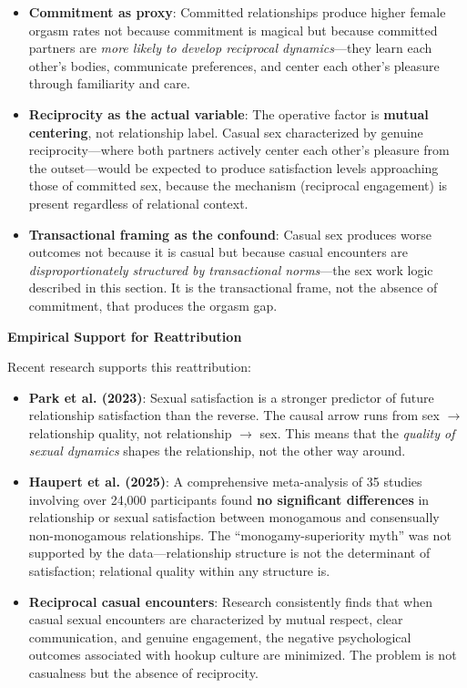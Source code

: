 \documentclass[12pt, letterpaper]{article}
\begin{document}
\begin{itemize}
    \item \textbf{Commitment as proxy}: Committed relationships produce higher female orgasm rates not because commitment is magical but because committed partners are \textit{more likely to develop reciprocal dynamics}---they learn each other's bodies, communicate preferences, and center each other's pleasure through familiarity and care.
    
    \item \textbf{Reciprocity as the actual variable}: The operative factor is \textbf{mutual centering}, not relationship label. Casual sex characterized by genuine reciprocity---where both partners actively center each other's pleasure from the outset---would be expected to produce satisfaction levels approaching those of committed sex, because the mechanism (reciprocal engagement) is present regardless of relational context.
    
    \item \textbf{Transactional framing as the confound}: Casual sex produces worse outcomes not because it is casual but because casual encounters are \textit{disproportionately structured by transactional norms}---the sex work logic described in this section. It is the transactional frame, not the absence of commitment, that produces the orgasm gap.
\end{itemize}

\textbf{Empirical Support for Reattribution}

Recent research supports this reattribution:

\begin{itemize}
    \item \textbf{Park et al. (2023)}: Sexual satisfaction is a stronger predictor of future relationship satisfaction than the reverse. The causal arrow runs from sex $\rightarrow$ relationship quality, not relationship $\rightarrow$ sex. This means that the \textit{quality of sexual dynamics} shapes the relationship, not the other way around.
    
    \item \textbf{Haupert et al. (2025)}: A comprehensive meta-analysis of 35 studies involving over 24,000 participants found \textbf{no significant differences} in relationship or sexual satisfaction between monogamous and consensually non-monogamous relationships. The ``monogamy-superiority myth'' was not supported by the data---relationship structure is not the determinant of satisfaction; relational quality within any structure is.
    
    \item \textbf{Reciprocal casual encounters}: Research consistently finds that when casual sexual encounters are characterized by mutual respect, clear communication, and genuine engagement, the negative psychological outcomes associated with hookup culture are minimized. The problem is not casualness but the absence of reciprocity.
\end{itemize}
\end{document}
